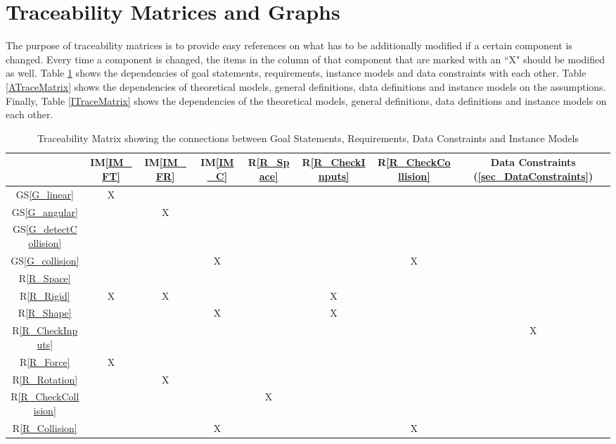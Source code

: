 \documentclass[12pt]{article}
\newcommand{\gsref}[1]{GS\ref{#1}}
\newcommand{\iref}[1]{IM\ref{#1}}
\newcommand{\rref}[1]{R\ref{#1}}
\begin{document}
%
%

\section{Traceability Matrices and Graphs} \label{sec_tmag}

The purpose of traceability matrices is to provide easy references on what has to be additionally modified if a certain component is changed. Every time a component is changed, the items in the column of that component that are marked with an ``X" should be modified as well. Table \ref{RTraceMatrix} shows the dependencies of goal statements, requirements, instance models and data constraints with each other. Table \ref{ATraceMatrix} shows the dependencies of theoretical models, general definitions, data definitions and instance models on the assumptions. Finally, Table \ref{ITraceMatrix} shows the dependencies of the theoretical models, general definitions, data definitions and instance models on each other. \\

\renewcommand*{\thetable}{3}
\begin{table}[h!]
\renewcommand*{\arraystretch}{1.2}
\centering
\begin{tabular}{|c|c|c|c|c|c|c|c|}
\hline
& \iref{IM_FT} & \iref{IM_FR} & \iref{IM_C} & \rref{R_Space} & \rref{R_CheckInputs} & \rref{R_CheckCollision} & Data Constraints (\ref{sec_DataConstraints}) \\ \hline
\gsref{G_linear}			&X& & & & & & \\ \hline
\gsref{G_angular} 			& &X& & & & & \\ \hline
\gsref{G_detectCollision} 	& & & & & & & \\ \hline
\gsref{G_collision} 		& & &X& & &X& \\ \hline
\rref{R_Space} 				& & & & & & & \\ \hline
\rref{R_Rigid} 				&X&X& & &X& & \\ \hline
\rref{R_Shape} 				& & &X& &X& & \\ \hline
\rref{R_CheckInputs} 		& & & & & & &X\\ \hline
\rref{R_Force} 				&X& & & & & & \\ \hline
\rref{R_Rotation} 			& &X& & & & & \\ \hline
\rref{R_CheckCollision} 	& & & &X& & & \\ \hline
\rref{R_Collision} 			& & &X& & &X& \\ \hline
\end{tabular}
\bigskip
\caption{Traceability Matrix showing the connections between Goal Statements, Requirements, Data Constraints and Instance Models} \label{RTraceMatrix}
\end{table}
\end{document}
